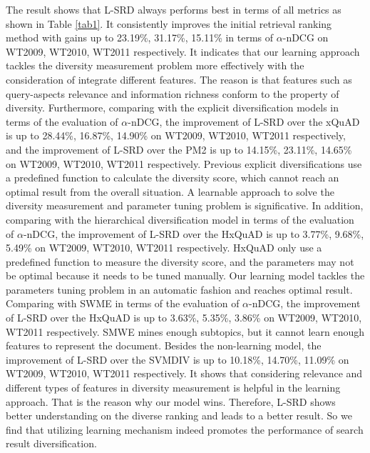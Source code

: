 \documentclass[review]{elsarticle}
\newcommand\revised[1]{{\color{black} #1}}
\begin{document}
The result shows that L-SRD always performs best in terms of all metrics as shown in Table \ref{tab1}. It consistently improves the initial retrieval ranking method with gains up to \revised{23.19\%, 31.17\%, 15.11\%} in terms of $\alpha$-nDCG on WT2009, WT2010, WT2011 respectively. It indicates that our learning approach tackles the diversity measurement problem more effectively with the consideration of integrate different features. The reason is that features such as query-aspects relevance and information richness conform to the property of diversity. Furthermore, comparing with the explicit diversification models in terms of the evaluation of $\alpha$-nDCG, the improvement of L-SRD over the xQuAD is up to \revised{28.44\%, 16.87\%, 14.90\%} on WT2009, WT2010, WT2011 respectively, and the improvement of L-SRD over the PM2 is up to \revised{14.15\%, 23.11\%, 14.65\%} on WT2009, WT2010, WT2011 respectively. Previous explicit diversifications use a predefined function to calculate the diversity score, which cannot reach an optimal result from the overall situation. A learnable approach to solve the diversity measurement and parameter tuning problem is significative. 
\revised{
	In addition, comparing with the hierarchical diversification model in terms of the evaluation of $\alpha$-nDCG, the improvement of L-SRD over the HxQuAD is up to \revised{3.77\%, 9.68\%, 5.49\%} on WT2009, WT2010, WT2011 respectively. HxQuAD only use a predefined function to measure the diversity score, and the parameters may not be optimal because it needs to be tuned manually. Our learning model tackles the parameters tuning problem in an automatic fashion and reaches optimal result.
	Comparing with SWME in terms of the evaluation of $\alpha$-nDCG, the improvement of L-SRD over the HxQuAD is up to \revised{3.63\%, 5.35\%, 3.86\%} on WT2009, WT2010, WT2011 respectively. SMWE mines enough subtopics, but it cannot learn enough features to represent the document.
	}Besides the non-learning model, the improvement of L-SRD over the SVMDIV is up to 10.18\%, 14.70\%, 11.09\% on WT2009, WT2010, WT2011 respectively. It shows that considering relevance and different types of features in diversity measurement is helpful in the learning approach. That is the reason why our model wins. %
Therefore, L-SRD shows better understanding on the diverse ranking and leads to a better result. So we find that utilizing learning mechanism indeed promotes the performance of search result diversification.
\end{document}

